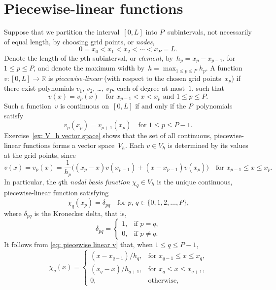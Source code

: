 \section{Piecewise-linear functions}
Suppose that we partition the interval~$[0,L]$ into $P$~subintervals, not 
necessarily of equal length, by choosing grid points, or \emph{nodes},
\begin{equation}\label{eq: 1d nodes}
0=x_0<x_1<x_2<\cdots<x_P=L.
\end{equation}
Denote the length of the $p$th subinterval, or \emph{element}, 
by~$h_p=x_p-x_{p-1}$, for~$1\le p\le P$, and denote the maximum width 
by~$h=\max_{1\le p\le P}h_p$.  A function $v:[0,L]\to\mathbb{R}$ is 
\emph{piecewise-linear} (with respect to the chosen grid points~$x_p$) if 
there exist polynomials $v_1$, $v_2$, \dots, $v_P$, each of degree at most~$1$, 
such that
\begin{equation}\label{eq: v piecewise}
v(x)=v_p(x)\quad\text{for $x_{p-1}<x<x_p$ and $1\le p\le P$.}
\end{equation}
Such a function~$v$ is continuous on~$[0,L]$ if and only if the $P$~polynomials 
satisfy
\begin{equation}\label{eq: v cts}
v_p(x_p)=v_{p+1}(x_p)\quad\text{for $1\le p\le P-1$.}
\end{equation}
Exercise~\ref{ex: V_h vector space} shows that the set of all continuous, 
piecewise-linear functions forms a vector space~$V_h$.  Each $v\in V_h$ is 
determined by its values at the grid points, 
since
\begin{equation}\label{eq: piecewise linear v}
v(x)=v_p(x)=\frac{1}{h_p}\bigl((x_p-x)v(x_{p-1})+(x-x_{p-1})v(x_p)\bigr)
    \quad\text{for $x_{p-1}\le x\le x_p$.}
\end{equation}
In particular, the $q$th \emph{nodal basis function} $\chi_q\in V_h$ is the 
unique continuous, piecewise-linear function satisfying
\begin{equation}\label{eq: chi q x p}
\chi_q(x_p)=\delta_{pq}\quad\text{for $p$, $q\in\{0, 1, 2, \ldots, P\}$,}
\end{equation}
where $\delta_{pq}$ is the Kronecker delta, that is,
\[
\delta_{pq}=\begin{cases}
1,&\text{if $p=q$,}\\ 0,&\text{if $p\ne q$.} 
\end{cases}
\]
It follows from \eqref{eq: piecewise linear v} that, when $1\le q\le P-1$,
\begin{equation}\label{eq: chi_q formula}
\chi_q(x)=\begin{cases}
	(x-x_{q-1})/h_q,&\text{for $x_{q-1}\le x\le x_q$,}\\
	(x_q-x)/h_{q+1},&\text{for $x_q\le x\le x_{q+1}$,}\\
	0,&\text{otherwise,}
\end{cases}
\end{equation}
